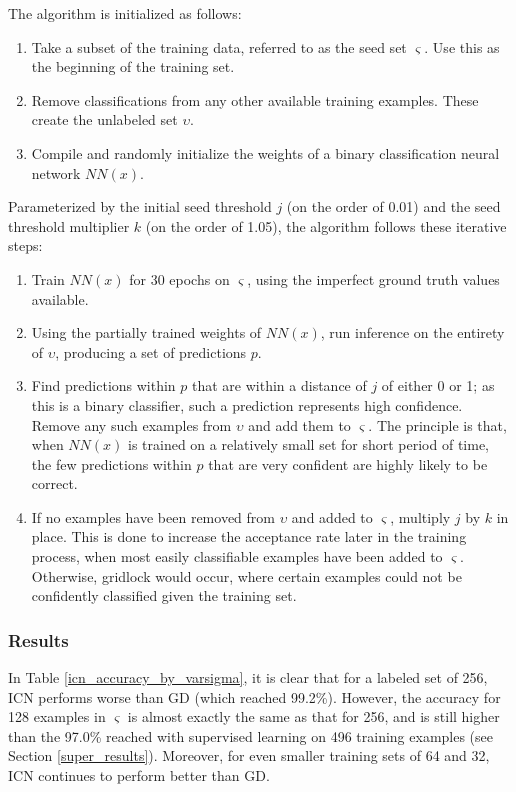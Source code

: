 \documentclass[10pt]{article}
\begin{document}
The algorithm is initialized as follows:

\begin{enumerate}
    \item Take a subset of the training data, referred to as the seed set $\varsigma$. Use this as the beginning of the training set.
    \item Remove classifications from any other available training examples. These create the unlabeled set $\upsilon$.
    \item Compile and randomly initialize the weights of a binary classification neural network $NN(x)$.
\end{enumerate}

Parameterized by the initial seed threshold $j$ (on the order of 0.01) and the seed threshold multiplier $k$ (on the order of 1.05), the algorithm follows these iterative steps:

\begin{enumerate}
    \item Train $NN(x)$ for 30 epochs on $\varsigma$, using the imperfect ground truth values available.
    \item Using the partially trained weights of $NN(x)$, run inference on the entirety of $\upsilon$, producing a set of predictions $p$.
    \item Find predictions within $p$ that are within a distance of $j$ of either 0 or 1; as this is a binary classifier, such a prediction represents high confidence. Remove any such examples from $\upsilon$ and add them to $\varsigma$. The principle is that, when $NN(x)$ is trained on a relatively small set for short period of time, the few predictions within $p$ that are very confident are highly likely to be correct.
    \item If no examples have been removed from $\upsilon$ and added to $\varsigma$, multiply $j$ by $k$ in place. This is done to increase the acceptance rate later in the training process, when most easily classifiable examples have been added to $\varsigma$. Otherwise, gridlock would occur, where certain examples could not be confidently classified given the training set.
\end{enumerate}

\subsubsection{Results}

In Table \ref{icn_accuracy_by_varsigma}, it is clear that for a labeled set of 256, ICN performs worse than GD (which reached 99.2\%). However, the accuracy for 128 examples in $\varsigma$ is almost exactly the same as that for 256, and is still higher than the 97.0\% reached with supervised learning on 496 training examples (see Section \ref{super_results}). Moreover, for even smaller training sets of 64 and 32, ICN continues to perform better than GD.
\end{document}
